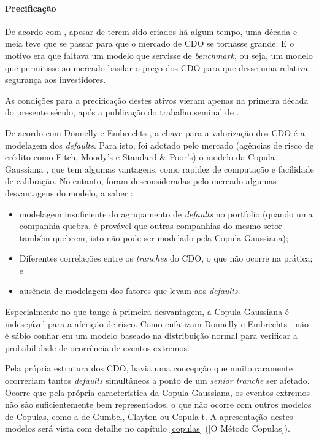 \documentclass[
	12pt,				%
	oneside,			%
	a4paper,			%
	chapter=TITLE,		%
	section=TITLE,		%
	english,			%
	brazil				%
	]{abntex2}
\begin{document}
\hypertarget{precificauxe7uxe3o}{%
\paragraph{Precificação}\label{precificauxe7uxe3o}}

De acordo com \textcite{watts}, apesar de terem sido criados há algum tempo, uma década e
meia teve que se passar para que o mercado de \gls{CDO} se tornasse grande. E o
motivo era que faltava um modelo que servisse de \emph{benchmark}, ou seja, um modelo
que permitisse ao mercado basilar o preço dos \gls{CDO} para que desse uma
relativa segurança aos investidores.

As condições para a precificação destes ativos vieram apenas na primeira década
do presente século, após a publicação do trabalho seminal de \textcite{Li}.

De acordo com Donnelly e Embrechts \autocite*[7]{devil}, a chave para a valorização dos
\gls{CDO} é a modelagem dos \emph{defaults}. Para isto, foi adotado pelo mercado
(agências de risco de crédito como Fitch, Moody's e Standard \& Poor's) o modelo
da Copula Gaussiana \autocite[14]{devil}, que tem algumas vantagens, como rapidez de
computação e facilidade de calibração. No entanto, foram desconsideradas pelo
mercado algumas desvantagens do modelo, a saber \autocite[15]{devil}:
\begin{itemize}
\tightlist
\item
  modelagem insuficiente do agrupamento de \emph{defaults} no portfolio (quando uma
  companhia quebra, é provável que outras companhias do mesmo setor também quebrem,
  isto não pode ser modelado pela Copula Gaussiana);
\item
  Diferentes correlações entre os \emph{tranches} do CDO, o que não ocorre na
  prática; e
\item
  ausência de modelagem dos fatores que levam aos \emph{defaults}.
\end{itemize}
Especialmente no que tange à primeira desvantagem, a Copula Gaussiana é
indesejável para a aferição de risco. Como enfatizam Donnelly e Embrechts
\autocite*[16]{devil}: não é sábio confiar em um modelo baseado na distribuição normal
para verificar a probabilidade de ocorrência de eventos extremos.

Pela própria estrutura dos \gls{CDO}, havia uma concepção que muito raramente
ocorreriam tantos \emph{defaults} simultâneos a ponto de um \emph{senior tranche} ser
afetado. Ocorre que pela própria característica da Copula Gaussiana, os eventos
extremos não são suficientemente bem representados, o que não ocorre com outros
modelos de Copulas, como a de Gumbel, Clayton ou Copula-t. A apresentação
destes modelos será vista com detalhe no capítulo \ref{copulas} ({[}O Método
Copulas{]}).
\end{document}
